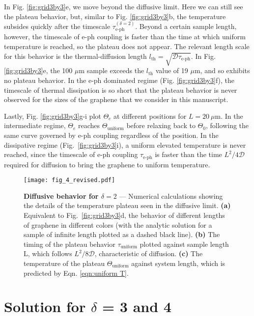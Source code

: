 \documentclass[aip, amsmath,amssymb, reprint]{revtex4-1}
\begin{document}
In Fig. \ref{fig:grid3by3}e, we move beyond the diffusive limit. Here we can still see the plateau behavior, but, similar to Fig. \ref{fig:grid3by3}b, the temperature subsides quickly after the timescale $\tau_{\text{e-ph}}^{(\delta=2)}$. Beyond a certain sample length, however, the timescale of e-ph coupling is faster than the time at which uniform temperature is reached, so the plateau does not appear. The relevant length scale for this behavior is the thermal-diffusion length $l_{\text{th}} = \sqrt{\mathcal{D}\tau_{\text{e-ph}}}$\cite{Song.201102t}. In Fig. \ref{fig:grid3by3}e, the 100 $\mu$m sample exceeds the $l_{\text{th}}$ value of 19 $\mu$m, and so exhibits no plateau behavior. In the e-ph dominated regime (Fig. \ref{fig:grid3by3}f), the timescale of thermal dissipation is so short that the plateau behavior is never observed for the sizes of the graphene that we consider in this manuscript.

Lastly, Fig. \ref{fig:grid3by3}g-i plot $\Theta_e$ at different positions for $L = 20~\mu$m. In the intermediate regime, $\Theta_e$ reaches $\Theta_{\text{uniform}}$ before relaxing back to $\Theta_0$, following the same curve governed by e-ph coupling regardless of the position. In the dissipative regime (Fig.~\ref{fig:grid3by3}i), a uniform elevated temperature is never reached, since the timescale of e-ph coupling $\tau_{\text{e-ph}}$ is faster than the time $L^{2}/4\mathcal{D}$ required for diffusion to bring the graphene to uniform temperature.

\begin{figure}\centering
\texttt{[image: fig\_4\_revised.pdf]}
\caption{\textbf{Diffusive behavior for $\delta=2$} --- Numerical calculations showing the details of the temperature plateau seen in the diffusive limit. \textbf{(a)} Equivalent to Fig.~\ref{fig:grid3by3}d, the behavior of different lengths of graphene in different colors (with the analytic solution for a sample of infinite length plotted as a dashed black line). \textbf{(b)} The timing of the plateau behavior $\tau_{\text{uniform}}$ plotted against sample length L, which follows $L^{2}/8\mathcal{D}$, characteristic of diffusion. \textbf{(c)} The temperature of the plateau $\Theta_{\text{uniform}}$ against system length, which is predicted by Eqn. \ref{eqn:uniform T}.}
\label{fig:delta2position}
\end{figure}

\section{Solution for $\delta$ = 3 and 4}\label{sec:d34}
\end{document}
